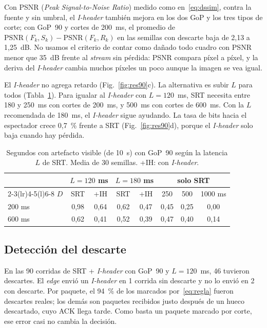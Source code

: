 \documentclass[10pt,twocolumn,letterpaper]{article}
\begin{document}
Con PSNR (\emph{Peak Signal-to-Noise Ratio}) medido como en~\eqref{eq:dssim}, contra la fuente y sin umbral, el \emph{I-header} también mejora en los dos GoP y los tres tipos de corte; con GoP~90 y cortes de 200~ms, el promedio de $\mathrm{PSNR}(F_k,S_k)-\mathrm{PSNR}(F_k,R_k)$ en las semillas con descarte baja de 2,13 a 1,25~dB. No usamos el criterio de contar como dañado todo cuadro con PSNR menor que 35~dB frente al \emph{stream} sin pérdida: PSNR compara píxel a píxel, y la deriva del \emph{I-header} cambia muchos píxeles un poco aunque la imagen se vea igual.

El \emph{I-header} no agrega retardo (Fig.~\ref{fig:res90}c). La alternativa es subir $L$ para todos (Tabla~\ref{tab:L}). Para igualar al \emph{I-header} con $L=120$~ms, SRT necesita entre 180 y 250~ms con cortes de 200~ms, y 500~ms con cortes de 600~ms. Con la $L$ recomendada de 180~ms, el \emph{I-header} sigue ayudando. La tasa de bits hacia el espectador crece 0,7~\% frente a SRT (Fig.~\ref{fig:res90}d), porque el \emph{I-header} solo baja cuando hay pérdida.

\begin{table}[t]
\centering
\caption{Segundos con artefacto visible (de 10~s) con GoP~90 según la latencia $L$ de SRT. Media de 30 semillas. +IH: con \emph{I-header}.}
\label{tab:L}
\footnotesize
\setlength{\tabcolsep}{3.5pt}
\begin{tabular}{@{}lccccccc@{}}
\toprule
& \multicolumn{2}{c}{$L=120$ ms} & \multicolumn{2}{c}{$L=180$ ms} & \multicolumn{3}{c}{solo SRT} \\
\cmidrule(lr){2-3}\cmidrule(lr){4-5}\cmidrule(l){6-8}
$D$ & SRT & +IH & SRT & +IH & 250 & 500 & 1000 ms \\
\midrule
200 ms & 0,98 & 0,64 & 0,62 & 0,47 & 0,45 & 0,25 & 0,00 \\
600 ms & 0,62 & 0,41 & 0,52 & 0,39 & 0,47 & 0,40 & 0,14 \\
\bottomrule
\end{tabular}
\end{table}

\subsection{Detección del descarte}
En las 90 corridas de SRT + \emph{I-header} con GoP~90 y $L=120$~ms, 46 tuvieron descartes. El \emph{edge} envió un \emph{I-header} en 1 corrida sin descarte y no lo envió en 2 con descarte. Por paquete, el 94~\% de los marcados por~\eqref{eq:regla} fueron descartes reales; los demás son paquetes recibidos justo después de un hueco descartado, cuyo ACK llega tarde. Como basta un paquete marcado por corte, ese error casi no cambia la decisión.
\end{document}
